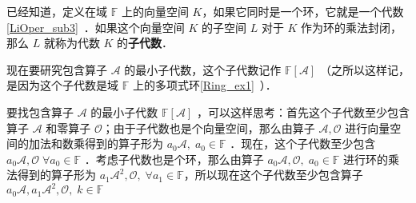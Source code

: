 
已经知道，定义在域 $\mathbb{F}$ 上的向量空间 $K$，如果它同时是一个环，它就是一个代数\autoref{LiOper_sub3}~．如果这个向量空间 $K$ 的子空间 $L$ 对于 $K$ 作为环的乘法封闭，那么 $L$ 就称为代数 $K$ 的\textbf{子代数}．

现在要研究包含算子 $\mathcal{A}$ 的最小子代数，这个子代数记作 $\mathbb{F}[\mathcal A]$ （之所以这样记，是因为这个子代数是域 $\mathbb{F}$ 上的多项式环\autoref{Ring_ex1}~）．

要找包含算子 $\mathcal{A}$ 的最小子代数 $\mathbb{F}[\mathcal A]$ ，可以这样思考：首先这个子代数至少包含算子 $\mathcal{A}$ 和零算子 $\mathcal{O}$；由于子代数也是个向量空间，那么由算子 $\mathcal{A,O}$ 进行向量空间的加法和数乘得到的算子形为 $a_0\mathcal{A},\;a_0\in\mathbb{F}$ ．现在，这个子代数至少包含 $a_0\mathcal{A,O}\;\forall a_0\in\mathbb{F}$ ．考虑子代数也是个环，那么由算子 $a_0\mathcal{A,O},\;a_0\in\mathbb{F}$ 进行环的乘法得到的算子形为 $a_1\mathcal{A}^2,\mathcal{O},\;\forall a_1\in\mathbb{F}$，所以现在这个子代数至少包含算子 $a_0\mathcal{A},a_1\mathcal{A}^2,\mathcal{O},\;k\in\mathbb{F}$ 